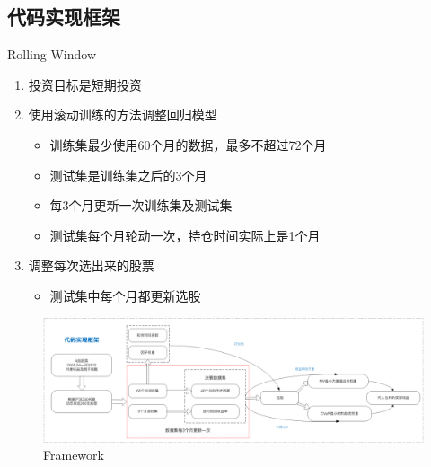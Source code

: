 \documentclass[CJK,aspectratio=43]{beamer}  %
\begin{document}
\subsection{代码实现框架}
\begin{frame}{Rolling Window}
	\begin{enumerate}
		\item 投资目标是短期投资
		\item 使用滚动训练的方法调整回归模型
		\begin{itemize}
			\item 训练集最少使用60个月的数据，最多不超过72个月
			\item 测试集是训练集之后的3个月
			\item 每3个月更新一次训练集及测试集
			\item 测试集每个月轮动一次，持仓时间实际上是1个月
		\end{itemize}
		\item 调整每次选出来的股票
		\begin{itemize}
			\item 测试集中每个月都更新选股
		\end{itemize}
	\end{enumerate}
	\begin{figure}
		\centering
		\includegraphics[width=0.95\linewidth]{pic/framework}
		\caption{Framework}
		\label{fig:framework}
	\end{figure}
\end{frame}
\end{document}
